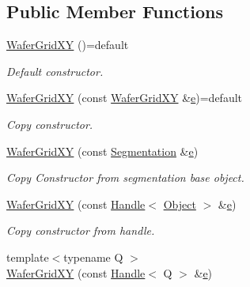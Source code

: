 \subsection*{Public Member Functions}
\begin{DoxyCompactItemize}
\item 
\hyperlink{class_d_d4hep_1_1_geometry_1_1_wafer_grid_x_y_a670a1a3bd33455d9673aad2aa3d405a7}{Wafer\+Grid\+XY} ()=default
\begin{DoxyCompactList}\small\item\em Default constructor. \end{DoxyCompactList}\item 
\hyperlink{class_d_d4hep_1_1_geometry_1_1_wafer_grid_x_y_afc1372a29ee56d9776941a3da2ad0c87}{Wafer\+Grid\+XY} (const \hyperlink{class_d_d4hep_1_1_geometry_1_1_wafer_grid_x_y}{Wafer\+Grid\+XY} \&\hyperlink{_volumes_8cpp_a8a9a1f93e9b09afccaec215310e64142}{e})=default
\begin{DoxyCompactList}\small\item\em Copy constructor. \end{DoxyCompactList}\item 
\hyperlink{class_d_d4hep_1_1_geometry_1_1_wafer_grid_x_y_aa6d983e937d1912b96e3a2f120458afa}{Wafer\+Grid\+XY} (const \hyperlink{class_d_d4hep_1_1_geometry_1_1_segmentation}{Segmentation} \&\hyperlink{_volumes_8cpp_a8a9a1f93e9b09afccaec215310e64142}{e})
\begin{DoxyCompactList}\small\item\em Copy Constructor from segmentation base object. \end{DoxyCompactList}\item 
\hyperlink{class_d_d4hep_1_1_geometry_1_1_wafer_grid_x_y_a40cd601f880f3a345e62dd233d4f8345}{Wafer\+Grid\+XY} (const \hyperlink{class_d_d4hep_1_1_handle}{Handle}$<$ \hyperlink{class_d_d4hep_1_1_geometry_1_1_wafer_grid_x_y_a94a234312cc2c123569319d3d33b24e0}{Object} $>$ \&\hyperlink{_volumes_8cpp_a8a9a1f93e9b09afccaec215310e64142}{e})
\begin{DoxyCompactList}\small\item\em Copy constructor from handle. \end{DoxyCompactList}\item 
{\footnotesize template$<$typename Q $>$ }\\\hyperlink{class_d_d4hep_1_1_geometry_1_1_wafer_grid_x_y_a7fbb6a82ca3ffb24be30752179e84a27}{Wafer\+Grid\+XY} (const \hyperlink{class_d_d4hep_1_1_handle}{Handle}$<$ Q $>$ \&\hyperlink{_volumes_8cpp_a8a9a1f93e9b09afccaec215310e64142}{e})

\end{DoxyCompactItemize}
